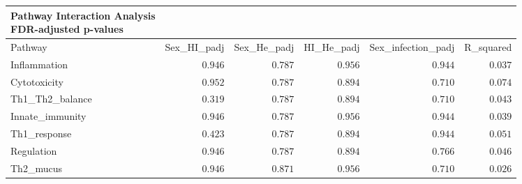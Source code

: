 \begin{longtable}{lrrrrr}
\caption*{
{\large Pathway Interaction Analysis} \\ 
{\small FDR-adjusted p-values}
} \\ 
\toprule
Pathway & Sex\_HI\_padj & Sex\_He\_padj & HI\_He\_padj & Sex\_infection\_padj & R\_squared \\ 
\midrule\addlinespace[2.5pt]
Inflammation & $0.946$ & $0.787$ & $0.956$ & $0.944$ & $0.037$ \\ 
Cytotoxicity & $0.952$ & $0.787$ & $0.894$ & $0.710$ & $0.074$ \\ 
Th1\_Th2\_balance & $0.319$ & $0.787$ & $0.894$ & $0.710$ & $0.043$ \\ 
Innate\_immunity & $0.946$ & $0.787$ & $0.956$ & $0.944$ & $0.039$ \\ 
Th1\_response & $0.423$ & $0.787$ & $0.894$ & $0.944$ & $0.051$ \\ 
Regulation & $0.946$ & $0.787$ & $0.894$ & $0.766$ & $0.046$ \\ 
Th2\_mucus & $0.946$ & $0.871$ & $0.956$ & $0.710$ & $0.026$ \\ 
\bottomrule
\end{longtable}

